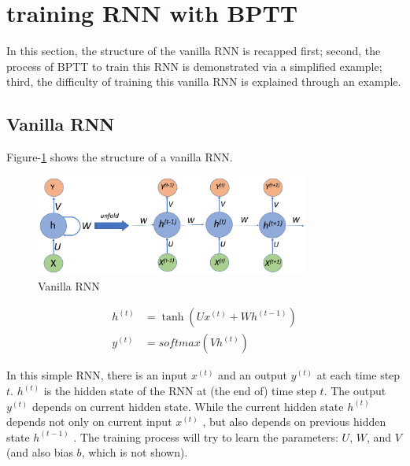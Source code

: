 \documentclass[english]{article}
\begin{document}
\section{training RNN with BPTT} \label{sec:rnn}
In this section, the structure of the vanilla RNN is recapped first; second, the process of BPTT to
train this RNN is demonstrated via a simplified example; third, the difficulty of training this vanilla RNN
is explained through an example.

\subsection{Vanilla RNN}
Figure-\ref{fig:vanillaRNN} shows the structure of a vanilla RNN.
\begin{figure}
	\centering
	\includegraphics[width=0.8\textwidth]{rnn}
	\caption{Vanilla RNN}
	\label{fig:vanillaRNN}
\end{figure}

\begin{align}
h^{(t)} &= \tanh(Ux^{(t)} + Wh^{(t-1)})\\
y^{(t)} &= softmax(Vh^{(t)})
\end{align}

In this simple RNN, there is an input $x^{(t)}$ and an output $y^{(t)}$ at each time step $t$. $h^{(t)}$ is the hidden state of the RNN at (the end of) time step $t$. The output  $y^{(t)}$ depends on current hidden state. While the current hidden state  $h^{(t)}$  depends not only on current input  $x^{(t)}$ ,
but also depends on previous hidden state  $h^{(t-1)}$ .
The training process will try to learn the parameters: $U$, $W$, and $V$ (and also bias $b$, which is not shown).
\end{document}
